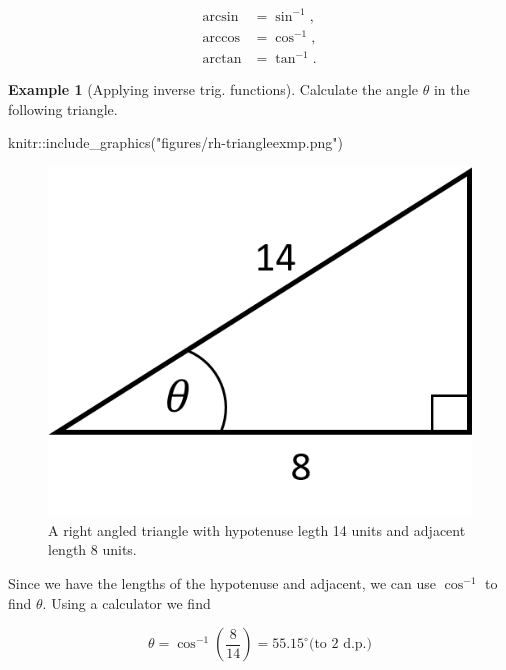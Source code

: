 \documentclass[
]{book}
\newenvironment{Shaded}{\begin{snugshade}}{\end{snugshade}}
\newcommand{\FunctionTok}[1]{\textcolor[rgb]{0.00,0.00,0.00}{#1}}
\newcommand{\NormalTok}[1]{#1}
\newcommand{\SpecialCharTok}[1]{\textcolor[rgb]{0.00,0.00,0.00}{#1}}
\newcommand{\StringTok}[1]{\textcolor[rgb]{0.31,0.60,0.02}{#1}}
\theoremstyle{definition}
\theoremstyle{definition}
\newtheorem{example}{Example}[chapter]
\theoremstyle{definition}
\theoremstyle{definition}
\theoremstyle{remark}
\begin{document}
\begin{align*}
\arcsin&=\sin^{-1},\\
\arccos&=\cos^{-1},\\
\arctan&=\tan^{-1}.
\end{align*}

\begin{example}[Applying inverse trig. functions]
\protect\hypertarget{exm:inversetrig}{}\label{exm:inversetrig}Calculate the angle \(\theta\) in the following triangle.

\begin{Shaded}
\begin{Highlighting}[]
\NormalTok{knitr}\SpecialCharTok{::}\FunctionTok{include\_graphics}\NormalTok{(}\StringTok{"figures/rh{-}triangleexmp.png"}\NormalTok{)}
\end{Highlighting}
\end{Shaded}

\begin{figure}
\includegraphics{figures/rh-triangleexmp} \caption{A right angled triangle with hypotenuse legth 14 units and adjacent length 8 units.}\label{fig:inversetrigexmp}
\end{figure}

Since we have the lengths of the hypotenuse and adjacent, we can use \(\cos^{-1}\) to find \(\theta\). Using a calculator we find

\[\theta=\cos^{-1}\left(\frac{8}{14}\right)=55.15^\circ \text{(to 2 d.p.)}\]
\end{example}
\end{document}
